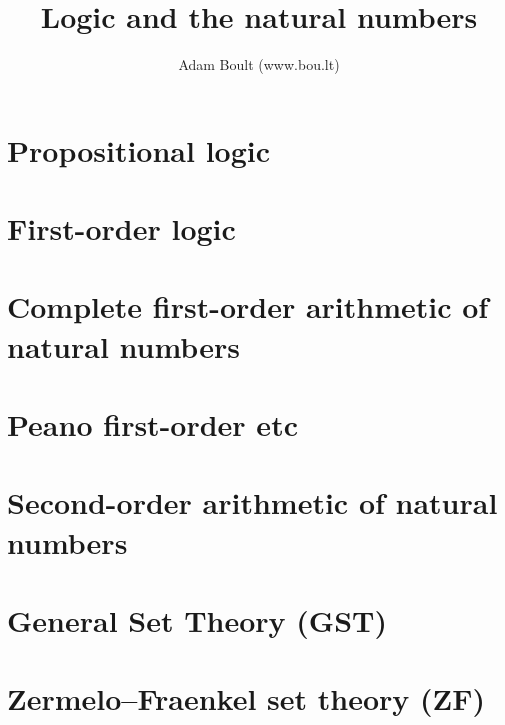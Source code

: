 \documentclass[oneside]{book}
\begin{document}
\author{Adam Boult (www.bou.lt)}
\title{Logic and the natural numbers}
\maketitle

\setcounter{tocdepth}{0}
\tableofcontents



\part{Propositional logic}




\part{First-order logic}



\part{Complete first-order arithmetic of natural numbers}









\part{Peano first-order etc}








\part{Second-order arithmetic of natural numbers}



\part{General Set Theory (GST)}






\part{Zermelo–Fraenkel set theory (ZF)}


\end{document}
